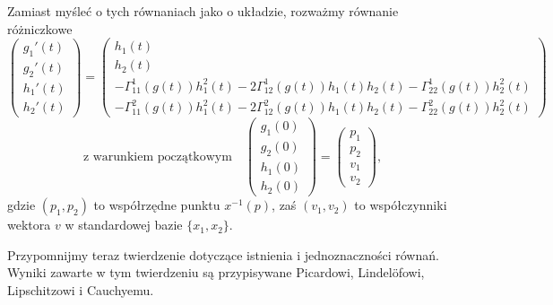 \begin{frame}[plain]

Zamiast myśleć o tych równaniach jako o układzie, rozważmy równanie różniczkowe
\[
\left(
\begin{aligned}
g_1'(t)\\
g_2'(t)\\
h_1'(t)\\
h_2'(t)
\end{aligned}
\right)=
\left(
\begin{gathered}
h_1(t)\\
h_2(t)\\
-\Gamma^1_{11}(g(t))h_1^2(t)-2\Gamma^1_{12}(g(t))h_1(t)h_2(t)-\Gamma^1_{22}(g(t))h_2^2(t)\\
-\Gamma^2_{11}(g(t))h_1^2(t)-2\Gamma^2_{12}(g(t))h_1(t)h_2(t)-\Gamma^2_{22}(g(t))h_2^2(t)
\end{gathered}
\right)%
\]\pause\[\text{z warunkiem początkowym}\quad\left(
\begin{aligned}
g_1(0)\\
g_2(0)\\
h_1(0)\\
h_2(0)
\end{aligned}
\right)=
\left(
\begin{aligned}
p_1\\
p_2\\
v_1\\
v_2
\end{aligned}
\right),\]
gdzie $(p_1,p_2)$ to współrzędne punktu $x^{-1}(p)$, zaś $(v_1,v_2)$ to współczynniki wektora $v$ w standardowej bazie $\{x_1,x_2\}$.

\end{frame}
Przypomnijmy teraz twierdzenie dotyczące istnienia i jednoznaczności równań. Wyniki zawarte w tym twierdzeniu są przypisywane Picardowi, Lindelöfowi, Lipschitzowi i Cauchyemu.


